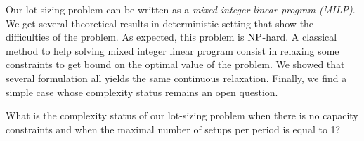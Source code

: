 Our lot-sizing problem can be written as a \emph{mixed integer linear program (MILP)}.
We get several theoretical results in deterministic setting that show the difficulties of the problem.
As expected, this problem is $\operatorname{NP}$-hard.
A classical method to help solving mixed integer linear program consist in relaxing some constraints to get bound on the optimal value of the problem.
We showed that several formulation all yields the same continuous relaxation.
Finally, we find a simple case whose complexity status remains an open question.
\begin{question}
What is the complexity status of our lot-sizing problem when there is no capacity constraints and when the maximal number of setups per period is equal to 1?
\end{question}


